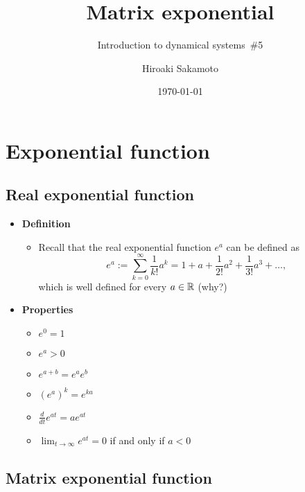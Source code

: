 \documentclass[12pt,a4paper]{article}
\title{Matrix exponential}
\subtitle{Introduction to dynamical systems~\#5}
\author{Hiroaki Sakamoto}
\date{\today}
\begin{document}
\maketitle
\tableofcontents

\section{Exponential function}

\subsection{Real exponential function}

\begin{itemize}
\item \textbf{Definition}
  \begin{itemize}
  \item Recall that the real exponential function $e^{a}$ can be defined as
    \begin{equation}\nonumber%
      e^{a} := \sum_{k=0}^{\infty} \frac{1}{k!}a^{k} = 1 + a + \frac{1}{2!}a^{2} + \frac{1}{3!}a^{3} + \ldots,
    \end{equation}
    which is well defined for every $a\in \mathbb{R}$ (why?)
  \end{itemize}

\item \textbf{Properties}
  \begin{itemize}
  \item $e^{0} = 1$
  \item $e^{a} >0$
  \item $e^{a+b} = e^{a}e^{b}$
  \item $(e^{a})^{k} = e^{ka}$
  \item $\frac{d}{dt}e^{at} = ae^{at}$
  \item $\lim_{t\to\infty}e^{at} = 0$ if and only if $a<0$
  \end{itemize}

\end{itemize}

\subsection{Matrix exponential function}
\end{document}
